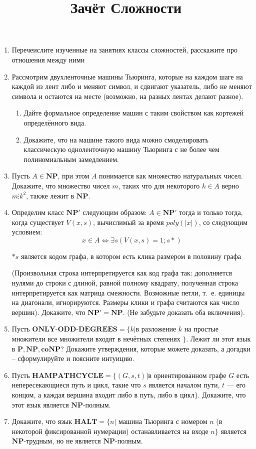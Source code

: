 \documentclass[a4paper, 12pt]{article}
\title{Зачёт Сложности}
\begin{document}
    \maketitle
    \begin{enumerate}
        \item Перечеислите изученные на занятиях классы сложностей, расскажите про отношения между ними
        \item Рассмотрим двухленточные машины Тьюринга, которые на каждом шаге на каждой из лент либо
        и меняют символ, и сдвигают указатель, либо не меняют символа и остаются на месте (возможно, на
        разных лентах делают разное).
        \begin{enumerate}
            \item Дайте формальное определение машин с таким свойством как кортежей определённого вида.
            \item Докажите, что на машине такого вида можно смоделировать классическую одноленточную машину
            Тьюринга с не более чем полиномиальным замедлением.
        \end{enumerate}
        \item Пусть $A\in \mathbf{NP}$, при этом $A$ понимается как множество натуральных чисел. Докажите, что
        множество чисел $m$, таких что для некоторого $k\in A$ верно $m\vdots k^2$, также лежит в $\mathbf{NP}$.
        \item Определим класс $\mathbf{NP'}$ следующим образом: $A\in\mathbf{NP'}$ тогда и только тогда, когда существует
        $V(x, s)$, вычислимый за время $poly(|x|)$, со следующим условием:
\[x \in A \Leftrightarrow \exists s(V (x, s) = 1;s *) \]

$*s$ является кодом графа, в котором есть клика размером в половину графа

(Произвольная строка интерпретируется как код графа так: дополняется нулями до строки с длиной,
равной полному квадрату, полученная строка интерпретируется как матрица смежности. Возможные
петли, т.~е. единицы на диагонали, игнорируются. Размеры клики и графа считаются как число вершин).
Докажите, что $\mathbf{NP'}=\mathbf{NP}$. (Не забудьте доказать оба включения).
    \item Пусть $\textbf{ONLY-ODD-DEGREES} = \{k | \text{в разложение }k$ на простые множители все множители входят
    в нечётных степенях $\}$. Лежит ли этот язык в $\mathbf P, \mathbf{NP}, \mathbf{coNP}$? Докажите утверждения, которые можете
    доказать, а догадки – сформулируйте и поясните интуицию.
    \item Пусть $\mathbf{HAMPATHCYCLE} = \{(G, s, t) | $в ориентированном графе $G$ есть непересекающиеся путь и
    цикл, такие что $s$ является началом пути, $t$ --- его концом, а каждая вершина входит либо в путь, либо
    в цикл$\}$. Докажите, что этот язык является $\mathbf{NP}$-полным.
    \item Докажите, что язык $\mathbf{HALT} = \{n |$ машина Тьюринга с номером $n$ (в некоторой фиксированной
    нумерации) останавливается на входе $n\}$ является $\mathbf{NP}$-трудным, но не является $\mathbf{NP}$-полным.
    \end{enumerate}
\end{document}
